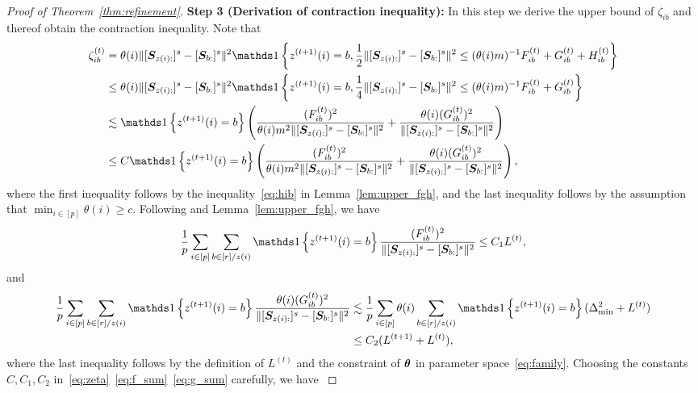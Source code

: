 \documentclass[lettersize,onecolumn,journal]{IEEEtran}
\theoremstyle{definition}
\theoremstyle{definition}
\newcommand{\of}[1]{\left(#1\right)}
\newcommand{\offf}[1]{\left\{#1\right\}}
\begin{document}
\begin{proof}[Proof of Theorem~\ref{thm:refinement}]
{    {\bf Step 3 (Derivation of contraction inequality):} In this step we derive the upper bound of $\zeta_{ib}$ and thereof obtain the contraction inequality. Note that 
    \begin{align}
        \zeta_{ib}^{(t)} &= \theta(i) \onormSize{}{ [ \mS_{ z(i):}  ]^s - [ \mS_{b:}  ]^s  }^2 \ind \offf{z^{(t+1)}(i) = b, \frac{1}{2}\onormSize{}{ [ \mS_{z(i):}  ]^s - [ \mS_{b:}  ]^s  }^2 \leq (\theta(i) m)^{-1} F_{ib}^{(t)} + G_{ib}^{(t)} + H_{ib}^{(t)} }\\
        & \leq \theta(i) \onormSize{}{ [ \mS_{ z(i):}  ]^s - [ \mS_{b:}  ]^s  }^2 \ind \offf{z^{(t+1)}(i) = b, \frac{1}{4}\onormSize{}{ [ \mS_{z(i):}  ]^s - [ \mS_{b:}  ]^s  }^2 \leq (\theta(i) m)^{-1} F_{ib}^{(t)} + G_{ib}^{(t)} } \\
        & \lesssim \ind \offf{ z^{(t+1)}(i) = b} \of{  \frac{(F_{ib}^{(t)})^2}{ \theta(i)m^2\onormSize{}{ [ \mS_{z(i):}  ]^s - [ \mS_{b:}  ]^s  }^2} + \frac{\theta(i)(G_{ib}^{(t)})^2}{ \onormSize{}{ [ \mS_{z(i):}  ]^s - [ \mS_{b:}  ]^s  }^2}    }\\
        &\leq C \ind \offf{ z^{(t+1)}(i) = b} \of{  \frac{(F_{ib}^{(t)})^2}{ \theta(i)m^2\onormSize{}{ [ \mS_{z(i):}  ]^s - [ \mS_{b:}  ]^s  }^2} + \frac{\theta(i)(G_{ib}^{(t)})^2}{ \onormSize{}{ [ \mS_{z(i):}  ]^s - [ \mS_{b:}  ]^s  }^2}    },\label{eq:zeta}
    \end{align}
    where the first inequality follows by the inequality~\eqref{eq:hib} in Lemma~\ref{lem:upper_fgh}, and the last inequality follows by the assumption that $\min_{i \in [p]} \theta(i) \geq c$. Following \citet[Step 4, Proof of Theorem 2]{han2020exact} and Lemma~\ref{lem:upper_fgh}, we have 
    \begin{align}\label{eq:f_sum}
          \frac{1}{p} \sum_{i \in [p]}\sum_{b \in [r]/z(i)} \ind \offf{ z^{(t+1)}(i) = b} \frac{(F_{ib}^{(t)})^2}{ \onormSize{}{ [ \mS_{z(i):}  ]^s - [ \mS_{b:}  ]^s  }^2} \leq C_1 L^{(t)},
    \end{align}
    and 
    \begin{align}
         \frac{1}{p} \sum_{i \in [p]}\sum_{b \in [r]/z(i)} \ind \offf{ z^{(t+1)}(i) = b} \frac{\theta(i)(G_{ib}^{(t)})^2}{ \onormSize{}{ [ \mS_{z(i):}  ]^s - [ \mS_{b:}  ]^s  }^2}  &\lesssim \frac{1}{p} \sum_{i \in [p]}\theta(i) \sum_{b \in [r]/z(i)}   \ind \offf{ z^{(t+1)}(i) = b}  (\Delta_{\min}^2 + L^{(t)}) \\
         & \leq C_2 (L^{(t+1)} + L^{(t)}), \label{eq:g_sum}
    \end{align}
    where the last inequality follows by the definition of $L^{(t)}$ and the constraint of $\boldsymbol{\theta}$ in parameter space~\eqref{eq:family}. Choosing the constants $C, C_1, C_2$ in~\eqref{eq:zeta}~\eqref{eq:f_sum}~\eqref{eq:g_sum} carefully, we have 
}
\end{proof}
\end{document}
